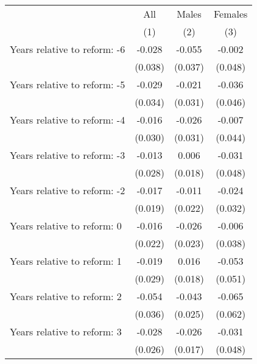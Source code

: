 \begin{tabular}{@{}l*{3}{c}}
\toprule \toprule
  & All & Males & Females \\
  & (1) & (2)   & (3)     \\ 
\toprule
Years relative to reform: -6&      -0.028         &      -0.055         &      -0.002         \\
                    &     (0.038)         &     (0.037)         &     (0.048)         \\
Years relative to reform: -5&      -0.029         &      -0.021         &      -0.036         \\
                    &     (0.034)         &     (0.031)         &     (0.046)         \\
Years relative to reform: -4&      -0.016         &      -0.026         &      -0.007         \\
                    &     (0.030)         &     (0.031)         &     (0.044)         \\
Years relative to reform: -3&      -0.013         &       0.006         &      -0.031         \\
                    &     (0.028)         &     (0.018)         &     (0.048)         \\
Years relative to reform: -2&      -0.017         &      -0.011         &      -0.024         \\
                    &     (0.019)         &     (0.022)         &     (0.032)         \\
Years relative to reform: 0&      -0.016         &      -0.026         &      -0.006         \\
                    &     (0.022)         &     (0.023)         &     (0.038)         \\
Years relative to reform: 1&      -0.019         &       0.016         &      -0.053         \\
                    &     (0.029)         &     (0.018)         &     (0.051)         \\
Years relative to reform: 2&      -0.054         &      -0.043\sym{*}  &      -0.065         \\
                    &     (0.036)         &     (0.025)         &     (0.062)         \\
Years relative to reform: 3&      -0.028         &      -0.026         &      -0.031         \\
                    &     (0.026)         &     (0.017)         &     (0.048)         \\

\end{tabular}
